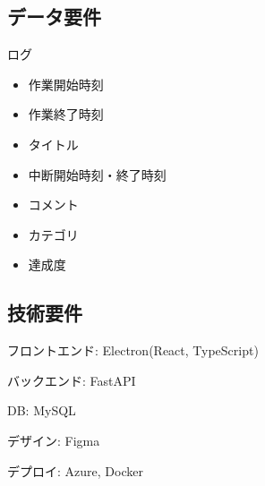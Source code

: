 \subsection{データ要件}

ログ
\begin{itemize}
  \item 作業開始時刻
  \item 作業終了時刻
  \item タイトル
  \item 中断開始時刻・終了時刻
  \item コメント
  \item カテゴリ
  \item 達成度
\end{itemize}

\subsection{技術要件}

フロントエンド: Electron(React, TypeScript)

バックエンド: FastAPI

DB: MySQL

デザイン: Figma

デプロイ: Azure, Docker
